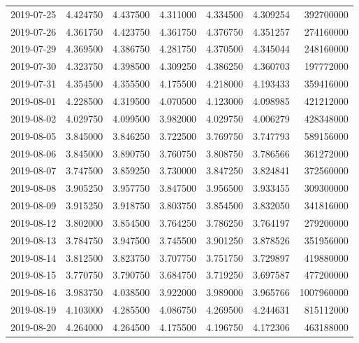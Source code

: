 \begin{tabular}{lrrrrrr}
2019-07-25 &    4.424750 &    4.437500 &    4.311000 &    4.334500 &    4.309254 &   392700000 \\
2019-07-26 &    4.361750 &    4.423750 &    4.361750 &    4.376750 &    4.351257 &   274160000 \\
2019-07-29 &    4.369500 &    4.386750 &    4.281750 &    4.370500 &    4.345044 &   248160000 \\
2019-07-30 &    4.323750 &    4.398500 &    4.309250 &    4.386250 &    4.360703 &   197772000 \\
2019-07-31 &    4.354500 &    4.355500 &    4.175500 &    4.218000 &    4.193433 &   359416000 \\
2019-08-01 &    4.228500 &    4.319500 &    4.070500 &    4.123000 &    4.098985 &   421212000 \\
2019-08-02 &    4.029750 &    4.099500 &    3.982000 &    4.029750 &    4.006279 &   428348000 \\
2019-08-05 &    3.845000 &    3.846250 &    3.722500 &    3.769750 &    3.747793 &   589156000 \\
2019-08-06 &    3.845000 &    3.890750 &    3.760750 &    3.808750 &    3.786566 &   361272000 \\
2019-08-07 &    3.747500 &    3.859250 &    3.730000 &    3.847250 &    3.824841 &   372560000 \\
2019-08-08 &    3.905250 &    3.957750 &    3.847500 &    3.956500 &    3.933455 &   309300000 \\
2019-08-09 &    3.915250 &    3.918750 &    3.803750 &    3.854500 &    3.832050 &   341816000 \\
2019-08-12 &    3.802000 &    3.854500 &    3.764250 &    3.786250 &    3.764197 &   279200000 \\
2019-08-13 &    3.784750 &    3.947500 &    3.745500 &    3.901250 &    3.878526 &   351956000 \\
2019-08-14 &    3.812500 &    3.823750 &    3.707750 &    3.751750 &    3.729897 &   419880000 \\
2019-08-15 &    3.770750 &    3.790750 &    3.684750 &    3.719250 &    3.697587 &   477200000 \\
2019-08-16 &    3.983750 &    4.038500 &    3.922000 &    3.989000 &    3.965766 &  1007960000 \\
2019-08-19 &    4.103000 &    4.285500 &    4.086750 &    4.269500 &    4.244631 &   815112000 \\
2019-08-20 &    4.264000 &    4.264500 &    4.175500 &    4.196750 &    4.172306 &   463188000 \\

\end{tabular}
